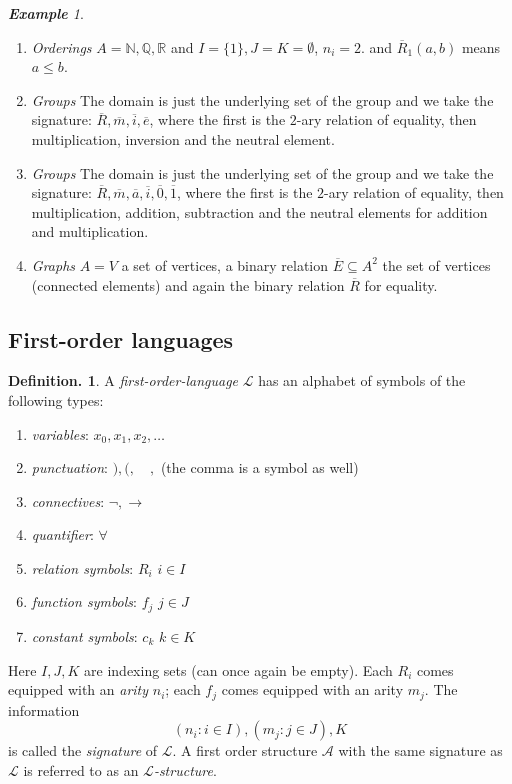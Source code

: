 \documentclass[a4paper,oneside,11pt,DIV=12,parskip=half]{scrartcl}
\newcommand{\R}{\mathbb R}
\newcommand{\N}{\mathbb N}
\theoremstyle{plain}
\theoremstyle{definition}
\newtheorem{definition}[theorem]{Definition.}
\newtheorem{remark, definition}[theorem]{Remark and Definition.}
\newtheorem{lemma, definition}[theorem]{Lemma and Definition.}
\newtheorem{theorem, definition}[theorem]{Theorem and Definition.}
\theoremstyle{remark}
\newtheorem*{example}{\textbf{Example}}
\newtheorem*{remark, example}{\textbf{Remark and Exercise}}
\begin{document}
\begin{example}
\begin{enumerate}
    \item \emph{Orderings}
    $A = \N, \mathbb{Q}, \R $ and $I = \{1\},J=K=\emptyset$, $n_i = 2$. and $\overline{R}_1(a,b)$ means $a\leq b$.
    \item \emph{Groups}
    The domain is just the underlying set of the group and we take the signature: $\overline{R},\overline{m},\overline{i},\overline{e}$, where the first is the $2$-ary relation of equality, then multiplication, inversion and the neutral element.
    \item \emph{Groups}
    The domain is just the underlying set of the group and we take the signature: $\overline{R},\overline{m},\overline{a},\overline{i},\overline{0},\overline{1}$, where the first is the $2$-ary relation of equality, then multiplication, addition, subtraction and the neutral elements for addition and multiplication.
    \item \emph{Graphs}
    $A = V$ a set of vertices, a binary relation $\overline{E} \subseteq A^2$ the set of vertices (connected elements) and again the binary relation $\overline{R}$ for equality.
\end{enumerate}
\end{example}

\subsection{First-order languages}
\begin{definition}
    A \emph{first-order-language} $\mathcal{L}$ has an alphabet of symbols of the following types:
    \begin{enumerate}
        \item \emph{variables}: $x_0,x_1,x_2,\dots$
        \item \emph{punctuation}: $),(,\quad ,$ (the comma is a symbol as well)
        \item \emph{connectives}: $\lnot, \rightarrow$
        \item \emph{quantifier}: $\forall$
        \item \emph{relation symbols}: $R_i$ $i \in I$
        \item \emph{function symbols}: $f_j$ $j \in J$
        \item \emph{constant symbols}: $c_k$ $k \in K$
    \end{enumerate}
    Here $I,J,K$ are indexing sets (can once again be empty). Each $R_i$ comes equipped with an \emph{arity} $n_i$; each $f_j$ comes equipped with an arity $m_j$.
    The information 
    \[ (n_i : i \in I), (m_j : j \in J), K \] is called the \emph{signature} of $\mathcal{L}$.
    A first order structure $\mathcal{A}$ with the same signature as $\mathcal{L}$  is referred to as an \emph{$\mathcal{L}$-structure}.
\end{definition}
\end{document}
